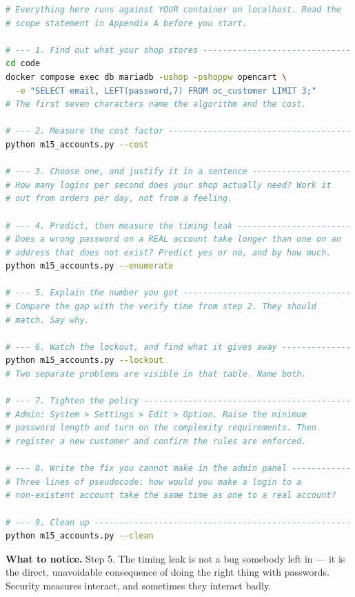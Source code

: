 \begin{lab}
\begin{lstlisting}[language=bash]
# Everything here runs against YOUR container on localhost. Read the
# scope statement in Appendix A before you start.

# --- 1. Find out what your shop stores ------------------------------
cd code
docker compose exec db mariadb -ushop -pshoppw opencart \
  -e "SELECT email, LEFT(password,7) FROM oc_customer LIMIT 3;"
# The first seven characters name the algorithm and the cost.

# --- 2. Measure the cost factor -------------------------------------
python m15_accounts.py --cost

# --- 3. Choose one, and justify it in a sentence --------------------
# How many logins per second does your shop actually need? Work it
# out from orders per day, not from a feeling.

# --- 4. Predict, then measure the timing leak -----------------------
# Does a wrong password on a REAL account take longer than one on an
# address that does not exist? Predict yes or no, and by how much.
python m15_accounts.py --enumerate

# --- 5. Explain the number you got ----------------------------------
# Compare the gap with the verify time from step 2. They should
# match. Say why.

# --- 6. Watch the lockout, and find what it gives away --------------
python m15_accounts.py --lockout
# Two separate problems are visible in that table. Name both.

# --- 7. Tighten the policy ------------------------------------------
# Admin: System > Settings > Edit > Option. Raise the minimum
# password length and turn on the complexity requirements. Then
# register a new customer and confirm the rules are enforced.

# --- 8. Write the fix you cannot make in the admin panel ------------
# Three lines of pseudocode: how would you make a login to a
# non-existent account take the same time as one to a real account?

# --- 9. Clean up ----------------------------------------------------
python m15_accounts.py --clean
\end{lstlisting}

\smallskip
\textbf{What to notice.} Step 5. The timing leak is not a bug somebody left in
--- it is the direct, unavoidable consequence of doing the right thing with
passwords. Security measures interact, and sometimes they interact badly.
\end{lab}

